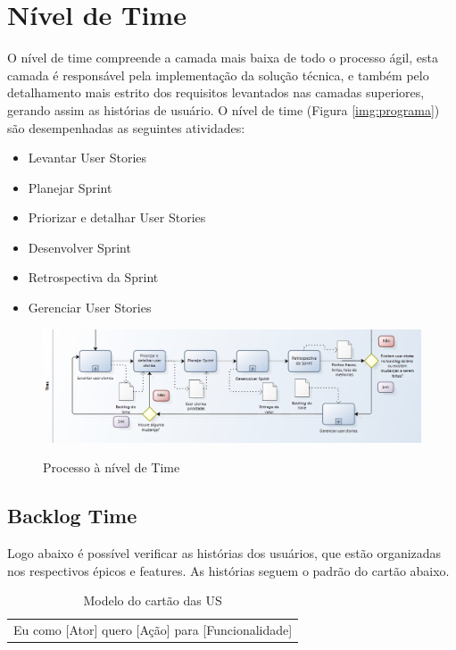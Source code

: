 \section{Nível de Time}

O nível de time compreende a camada mais baixa de todo o processo ágil, esta camada é responsável pela implementação da solução técnica, e também pelo detalhamento mais estrito dos requisitos levantados nas camadas superiores, gerando assim as histórias de usuário. O nível de time (Figura \ref{img:programa}) são desempenhadas as seguintes atividades:

\begin{itemize}
\item Levantar User Stories
\item Planejar Sprint
\item Priorizar e detalhar User Stories
\item Desenvolver Sprint
\item Retrospectiva da Sprint
\item Gerenciar User Stories
\end{itemize}

\FloatBarrier
\begin{figure}[!htpd]
		\centering
		\includegraphics[scale=0.4]{figuras/time}
		\label{img:time}
		\caption{Processo à nível de Time}
\end{figure}

\subsection{Backlog Time}

Logo abaixo é possível verificar as histórias dos usuários, que estão organizadas nos respectivos épicos e features. As histórias seguem o padrão do cartão abaixo.

\FloatBarrier
\begin{table}[!htpd]
\centering
\caption{Modelo do cartão das US}
\label{my-label}
\begin{tabular}{l}
Eu como {[}Ator{]} quero {[}Ação{]} para {[}Funcionalidade{]}
\end{tabular}
\end{table}
\FloatBarrier

